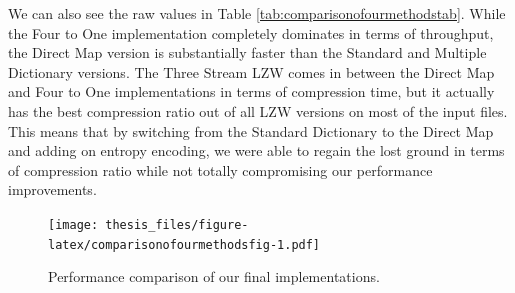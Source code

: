 \documentclass[12pt,twoside]{reedthesis}
\begin{document}
We can also see the raw values in Table \ref{tab:comparisonofourmethodstab}. While the Four to One implementation completely dominates in terms of throughput, the Direct Map version is substantially faster than the Standard and Multiple Dictionary versions. The Three Stream LZW comes in between the Direct Map and Four to One implementations in terms of compression time, but it actually has the best compression ratio out of all LZW versions on most of the input files. This means that by switching from the Standard Dictionary to the Direct Map and adding on entropy encoding, we were able to regain the lost ground in terms of compression ratio while not totally compromising our performance improvements.
\begin{figure}
\centering
\texttt{[image: thesis\_files/figure-latex/comparisonofourmethodsfig-1.pdf]}
\caption{\label{fig:comparisonofourmethodsfig}Performance comparison of our final implementations.}
\end{figure}
\end{document}
